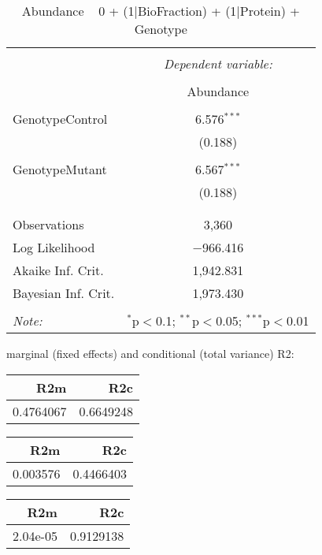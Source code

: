 \documentclass[11pt]{report}
\begin{document}
\begin{table}[!htbp] \centering 
  \caption{Abundance ~ 0 + (1|BioFraction) + (1|Protein) + Genotype} 
  \label{} 
\begin{tabular}{@{\extracolsep{5pt}}lc} 
\\[-1.8ex]\hline 
\hline \\[-1.8ex] 
 & \multicolumn{1}{c}{\textit{Dependent variable:}} \\ 
\cline{2-2} 
\\[-1.8ex] & Abundance \\ 
\hline \\[-1.8ex] 
 GenotypeControl & 6.576$^{***}$ \\ 
  & (0.188) \\ 
  & \\ 
 GenotypeMutant & 6.567$^{***}$ \\ 
  & (0.188) \\ 
  & \\ 
\hline \\[-1.8ex] 
Observations & 3,360 \\ 
Log Likelihood & $-$966.416 \\ 
Akaike Inf. Crit. & 1,942.831 \\ 
Bayesian Inf. Crit. & 1,973.430 \\ 
\hline 
\hline \\[-1.8ex] 
\textit{Note:}  & \multicolumn{1}{r}{$^{*}$p$<$0.1; $^{**}$p$<$0.05; $^{***}$p$<$0.01} \\ 
\end{tabular} 
\end{table} 
marginal (fixed effects) and conditional (total variance) R2:

\begin{tabular}{r|r}
\hline
R2m & R2c\\
\hline
0.4764067 & 0.6649248\\
\hline
\end{tabular}

\begin{tabular}{r|r}
\hline
R2m & R2c\\
\hline
0.003576 & 0.4466403\\
\hline
\end{tabular}

\begin{tabular}{r|r}
\hline
R2m & R2c\\
\hline
2.04e-05 & 0.9129138\\
\hline
\end{tabular}
\end{document}
